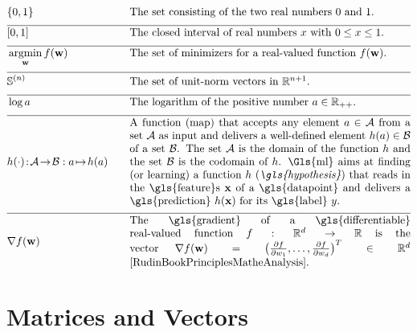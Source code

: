 \newpage
\begin{align}
		&\{0,1\}& \quad & \mbox{The set consisting of the two real numbers $0$ and $1$.} \nonumber \\[2mm] \hline \nonumber\\[-5mm]
	&[0,1] &\quad &\mbox{The closed interval of real numbers $x$ with $0 \leq x \leq 1$. }\nonumber \\[2mm] \hline \nonumber\\[-5mm]
    &\argmin_{\weights} f(\weights) &\quad &\mbox{The set of minimizers for a real-valued function $f(\weights)$.  } \nonumber \\[2mm] \hline \nonumber\\[-5mm]
    &\sphere{\nrnodes} &\quad &\mbox{The set of unit-norm vectors in $\mathbb{R}^{\nrnodes+1}$.  }\nonumber \\[2mm] \hline \nonumber\\[-5mm]
	 &\log a &\quad &\mbox{The logarithm of the positive number $a \in \mathbb{R}_{++}$.  } \nonumber \\[2mm] \hline \nonumber\\[-5mm]
	 &\hypothesis(\cdot)\!:\!\mathcal{A}\!\rightarrow\!\mathcal{B} :  a \!\mapsto\!h(a) &\quad &\parbox{.75\textwidth}{
	 	A function (map) that accepts any element $a \in \mathcal{A}$ from a set $\mathcal{A}$ 
	 	as input and delivers a well-defined element $h(a) \in \mathcal{B}$ of a set $\mathcal{B}$. 
	 	The set $\mathcal{A}$ is the domain of the function $h$ and the set $\mathcal{B}$ is the 
	 	codomain of $\hypothesis$. \Gls{ml} aims at finding (or learning) a function $\hypothesis$ (\emph{\gls{hypothesis}}) 
	 	that reads in the \gls{feature}s $\featurevec$ of a \gls{datapoint} and delivers a \gls{prediction} $\hypothesis(\featurevec)$
	 	for its \gls{label} $\truelabel$.} \nonumber \\[2mm] \hline \nonumber\\[-5mm]
	 	&\nabla f(\weights) & \quad & \parbox{.75\textwidth}{The \gls{gradient} of a \gls{differentiable} real-valued function 
	 	$f: \mathbb{R}^{\featuredim}\rightarrow \mathbb{R}$ is the vector 
	 	$\nabla f(\weights) = \big( \frac{\partial f}{\partial \weight_{1}},\ldots,\frac{\partial f}{\partial \weight_{\featuredim}}  \big)^{T} \in \mathbb{R}^{\featuredim}$ \cite[Ch. 9]{RudinBookPrinciplesMatheAnalysis}.}   \nonumber
\end{align} 
\section*{Matrices and Vectors} 

